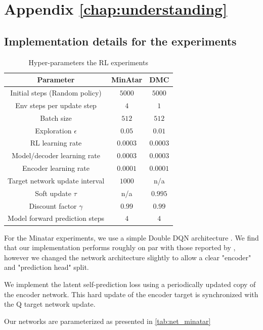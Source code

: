 \chapter{Appendix \autoref{chap:understanding}}


\section{Implementation details for the experiments}
\label{app:understanding:empirical}

\begin{table}[]
    \centering
    \begin{tabular}{c|c|c}
        Parameter & MinAtar & DMC \\\hline 
        Initial steps (Random policy) & $5000$ & $5000$  \\
        Env steps per update step & $4$ & $1$\\
        Batch size & $512$ & $512$\\
        Exploration $\epsilon$ & $0.05$ & $0.01$\\
        RL learning rate & $0.0003$ & $0.0003$\\
        Model/decoder learning rate & $0.0003$ & $0.0003$\\
        Encoder learning rate & $0.0001$ & $0.0001$\\
        Target network update interval & $1000$ & n/a\\
        Soft update $\tau$ & n/a & $0.995$ \\
        Discount factor $\gamma$ & $0.99$ & $0.99$\\
        Model forward prediction steps & $4$ & $4$\\
    \end{tabular}
    \caption{Hyper-parameters the RL experiments}
    \label{tab:hyper_minatar}
\end{table}

For the Minatar experiments, we use a simple Double DQN architecture \parencite{van2016deep}.
We find that our implementation performs roughly on par with those reported by \textcite{young19minatar}, however we changed the network architecture slightly to allow a clear "encoder" and "prediction head" split.

We implement the latent self-prediction loss using a periodically updated copy of the encoder network. This hard update of the encoder target is synchronized with the Q target network update.

Our networks are parameterized as presented in \autoref{tab:net_minatar}

